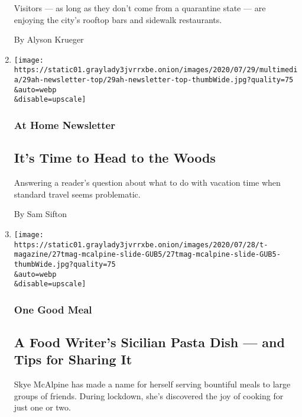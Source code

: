 \begin{enumerate}
  Visitors --- as long as they don't come from a quarantine state ---
  are enjoying the city's rooftop bars and sidewalk restaurants.

  By Alyson Krueger
\item
  \href{/2020/07/29/at-home/newsletter.html}{}

  \texttt{[image: https://static01.graylady3jvrrxbe.onion/images/2020/07/29/multimedia/29ah-newsletter-top/29ah-newsletter-top-thumbWide.jpg?quality=75\\\&auto=webp\\\&disable=upscale]}

  \hypertarget{at-home-newsletter-1}{%
  \subsubsection{At Home Newsletter}\label{at-home-newsletter-1}}

  \hypertarget{its-time-to-head-to-the-woods}{%
  \subsection{It's Time to Head to the
  Woods}\label{its-time-to-head-to-the-woods}}

  Answering a reader's question about what to do with vacation time when
  standard travel seems problematic.

  By Sam Sifton
\item
  \href{/2020/07/29/t-magazine/skye-mcalpine-pasta-cooking.html}{}

  \texttt{[image: https://static01.graylady3jvrrxbe.onion/images/2020/07/28/t-magazine/27tmag-mcalpine-slide-GUB5/27tmag-mcalpine-slide-GUB5-thumbWide.jpg?quality=75\\\&auto=webp\\\&disable=upscale]}

  \hypertarget{one-good-meal}{%
  \subsubsection{One Good Meal}\label{one-good-meal}}

  \hypertarget{a-food-writers-sicilian-pasta-dish--and-tips-for-sharing-it}{%
  \subsection{A Food Writer's Sicilian Pasta Dish --- and Tips for
  Sharing
  It}\label{a-food-writers-sicilian-pasta-dish--and-tips-for-sharing-it}}

  Skye McAlpine has made a name for herself serving bountiful meals to
  large groups of friends. During lockdown, she's discovered the joy of
  cooking for just one or two.


\end{enumerate}

